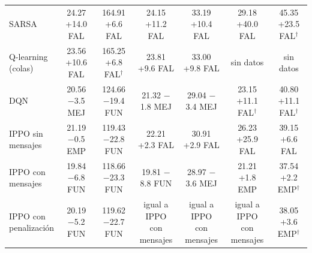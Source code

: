 \begin{table}[H]
\begin{tabular}{lcccccc}
SARSA & \makecell{24.27\\+14.0 FAL} & \makecell{164.91\\+6.6 FAL} & \makecell{24.15\\+11.2 FAL} & \makecell{33.19\\+10.4 FAL} & \makecell{29.18\\+40.0 FAL} & \makecell{45.35\\+23.5 FAL$^{\dagger}$} \\
\makecell[l]{Q-learning\\(colas)} & \makecell{23.56\\+10.6 FAL} & \makecell{165.25\\+6.8 FAL$^{\dagger}$} & \makecell{23.81\\+9.6 FAL} & \makecell{33.00\\+9.8 FAL} & sin datos & sin datos \\
DQN & \makecell{20.56\\$-$3.5 MEJ} & \makecell{124.66\\$-$19.4 FUN} & \makecell{21.32\\$-$1.8 MEJ} & \makecell{29.04\\$-$3.4 MEJ} & \makecell{23.15\\+11.1 FAL$^{\dagger}$} & \makecell{40.80\\+11.1 FAL$^{\dagger}$} \\
\makecell[l]{IPPO sin\\mensajes} & \makecell{21.19\\$-$0.5 EMP} & \makecell{119.43\\$-$22.8 FUN} & \makecell{22.21\\+2.3 FAL} & \makecell{30.91\\+2.9 FAL} & \makecell{26.23\\+25.9 FAL} & \makecell{39.15\\+6.6 FAL} \\
\makecell[l]{IPPO con\\mensajes} & \makecell{19.84\\$-$6.8 FUN} & \makecell{118.66\\$-$23.3 FUN} & \makecell{19.81\\$-$8.8 FUN} & \makecell{28.97\\$-$3.6 MEJ} & \makecell{21.21\\+1.8 EMP} & \makecell{37.54\\+2.2 EMP$^{\dagger}$} \\
\makecell[l]{IPPO con\\penalización} & \makecell{20.19\\$-$5.2 FUN} & \makecell{119.62\\$-$22.7 FUN} & \makecell{igual a IPPO\\con mensajes} & \makecell{igual a IPPO\\con mensajes} & \makecell{igual a IPPO\\con mensajes} & \makecell{38.05\\+3.6 EMP$^{\dagger}$} \\

\end{tabular}
\end{table}
